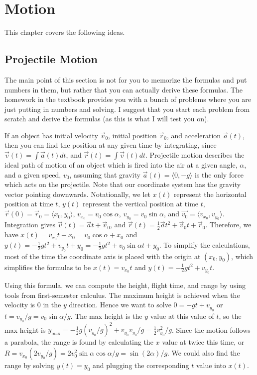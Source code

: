
\chapter{Motion}

This chapter covers the following ideas. 


\section{Projectile Motion}

The main point of this section is not for you to memorize the formulas
and put numbers in them, but rather that you can actually derive these
formulas.  The homework in the textbook provides you with a bunch of
problems where you are just putting in numbers and solving. I suggest
that you start each problem from scratch and derive the formulas (as
this is what I will test you on).


If an object has initial velocity {$ \vec v_0 $}, initial position {$
  \vec r_0 $}, and acceleration {$ \vec a(t) $}, then you can find the
position at any given time by integrating, since $\vec v(t)=\int \vec
a(t) dt$, and $\vec r(t)=\int \vec v(t)dt$.  Projectile motion describes
the ideal path of motion of an object which is fired into the air at a
given angle, $\alpha$, and a given speed, $v_0$, assuming that gravity
$\vec a(t) =\langle0,-g\rangle$ is the only force which acts on the
projectile. Note that our coordinate system has the gravity vector
pointing downwards. Notationally, we let $x(t)$ represent the horizontal position at time $t$, $y(t)$ represent the vertical position at time $t$, $\vec r(0)=\vec r_0 = \langle
x_0,y_0\rangle$, $v_{x_0} = v_0\cos \alpha$, $v_{y_0}=v_0\sin \alpha$, and
$\vec{v_0}=\langle v_{x_0},v_{y_0}\rangle$. Integration gives $\vec v(t)=\vec a
t+\vec v_0$, and $\vec r(t) =\frac{1}{2}\vec a t^2 +\vec v_0 t +\vec
r_0$. Therefore, we have $x(t) = v_{x_0}t +x_0= v_0\cos\alpha+x_0$ and
$y(t) = -\frac{1}{2}gt^2+v_{y_0}t+y_0=-\frac{1}{2}gt^2+v_0\sin\alpha
t+y_0$. To simplify the calculations, most of the time the coordinate
axis is placed with the origin at $(x_0,y_0)$, which simplifies the
formulas to be $x(t) = v_{x_0}t$ and $y(t) =
-\frac{1}{2}gt^2+v_{y_0}t$.

Using this formula, we can compute the height, flight time, and range
by using tools from first-semester calculus. The maximum height is
achieved when the velocity is $0$ in the $y$ direction.  Hence we want
to solve $0=-gt+v_{y_0}$ or $t=v_{y_0}/g = v_0\sin\alpha/g$.  The max
height is the $y$ value at this value of $t$, so the max height is
$y_{\text{max}} = -\frac{1}{2}g(v_{y_0}/g)^2+v_{y_0}v_{y_0}/g =
\frac{1}{2}v_{y_0}^2/g$.  Since the motion follows a parabola, the
range is found by calculating the $x$ value at twice this time, or $R
= v_{x_0}(2v_{y_0}/g) = 2v_0^2\sin\alpha\cos\alpha/g=\sin(2\alpha)/g$.  We could also
find the range by solving $y(t)=y_0$ and plugging the corresponding
$t$ value into $x(t)$.


